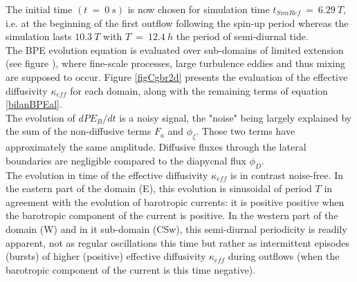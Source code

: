 The initial time $(t\ =\ 0\ s)$ is now chosen for simulation time $t_{SimRef}\ =\ 6.29\ T$, i.e. at the beginning of the first outflow following the spin-up period whereas the simulation lasts $10.3\ T$ with $T\ =\ 12.4\ h$ the period of semi-diurnal tide.\\
The BPE evolution equation is evaluated over sub-domains of limited extension (see figure ), where fine-scale processes, large turbulence eddies and thus mixing are supposed to occur. Figure \ref{figCgbr2d} presents the evaluation of the effective diffusivity $\kappa_{eff}$ for each domain, along with the remaining terms of equation \ref{bilanBPEal}.\\ 
The evolution of $dPE_B/dt$ is a noisy signal, the "noise" being largely explained by the sum of the non-diffusive terms $F_a$ and $\phi_{\zeta}$. Those two terms have approximately the same amplitude. Diffusive fluxes through the lateral boundaries are negligible compared to the diapycnal flux $\phi_D$.\\
The evolution in time of the effective diffusivity $\kappa_{eff}$ is in contrast noise-free. In the eastern part of the domain (E), this evolution is sinusoidal of period $T$ in agreement with the evolution of barotropic currents: it is positive positive when the barotropic component of the current is positive.
In the western part of the domain (W) and in it sub-domain (CSw), this semi-diurnal periodicity is readily apparent, not as regular oscillations this time but rather as intermittent episodes (bursts) of higher (positive) effective diffusivity $\kappa_{eff}$ during outflows (when the barotropic component of the current is this time negative).

